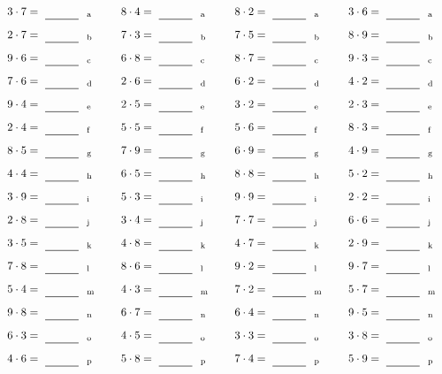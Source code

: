 \documentclass
[
  draft    = true,
  fontsize = 11pt,
  parskip  = half-
]
{scrartcl}
\begin{document}
\par\vfill\par
\begin{align*}
    \pline{3\cdot7}&=\rline{a}
  & \pline{8\cdot4}&=\rline{a}
  & \pline{8\cdot2}&=\rline{a}
  & \pline{3\cdot6}&=\rline{a} \\[1ex]
    \pline{2\cdot7}&=\rline{b}
  & \pline{7\cdot3}&=\rline{b}
  & \pline{7\cdot5}&=\rline{b}
  & \pline{8\cdot9}&=\rline{b} \\[1ex]
    \pline{9\cdot6}&=\rline{c}
  & \pline{6\cdot8}&=\rline{c}
  & \pline{8\cdot7}&=\rline{c}
  & \pline{9\cdot3}&=\rline{c} \\[1ex]
    \pline{7\cdot6}&=\rline{d}
  & \pline{2\cdot6}&=\rline{d}
  & \pline{6\cdot2}&=\rline{d}
  & \pline{4\cdot2}&=\rline{d} \\[1ex]
    \pline{9\cdot4}&=\rline{e}
  & \pline{2\cdot5}&=\rline{e}
  & \pline{3\cdot2}&=\rline{e}
  & \pline{2\cdot3}&=\rline{e} \\[1ex]
    \pline{2\cdot4}&=\rline{f}
  & \pline{5\cdot5}&=\rline{f}
  & \pline{5\cdot6}&=\rline{f}
  & \pline{8\cdot3}&=\rline{f} \\[1ex]
    \pline{8\cdot5}&=\rline{g}
  & \pline{7\cdot9}&=\rline{g}
  & \pline{6\cdot9}&=\rline{g}
  & \pline{4\cdot9}&=\rline{g} \\[1ex]
    \pline{4\cdot4}&=\rline{h}
  & \pline{6\cdot5}&=\rline{h}
  & \pline{8\cdot8}&=\rline{h}
  & \pline{5\cdot2}&=\rline{h} \\[1ex]
    \pline{3\cdot9}&=\rline{i}
  & \pline{5\cdot3}&=\rline{i}
  & \pline{9\cdot9}&=\rline{i}
  & \pline{2\cdot2}&=\rline{i} \\[1ex]
    \pline{2\cdot8}&=\rline{j}
  & \pline{3\cdot4}&=\rline{j}
  & \pline{7\cdot7}&=\rline{j}
  & \pline{6\cdot6}&=\rline{j} \\[1ex]
    \pline{3\cdot5}&=\rline{k}
  & \pline{4\cdot8}&=\rline{k}
  & \pline{4\cdot7}&=\rline{k}
  & \pline{2\cdot9}&=\rline{k} \\[1ex]
    \pline{7\cdot8}&=\rline{l}
  & \pline{8\cdot6}&=\rline{l}
  & \pline{9\cdot2}&=\rline{l}
  & \pline{9\cdot7}&=\rline{l} \\[1ex]
    \pline{5\cdot4}&=\rline{m}
  & \pline{4\cdot3}&=\rline{m}
  & \pline{7\cdot2}&=\rline{m}
  & \pline{5\cdot7}&=\rline{m} \\[1ex]
    \pline{9\cdot8}&=\rline{n}
  & \pline{6\cdot7}&=\rline{n}
  & \pline{6\cdot4}&=\rline{n}
  & \pline{9\cdot5}&=\rline{n} \\[1ex]
    \pline{6\cdot3}&=\rline{o}
  & \pline{4\cdot5}&=\rline{o}
  & \pline{3\cdot3}&=\rline{o}
  & \pline{3\cdot8}&=\rline{o} \\[1ex]
    \pline{4\cdot6}&=\rline{p}
  & \pline{5\cdot8}&=\rline{p}
  & \pline{7\cdot4}&=\rline{p}
  & \pline{5\cdot9}&=\rline{p}
\end{align*}
\end{document}
